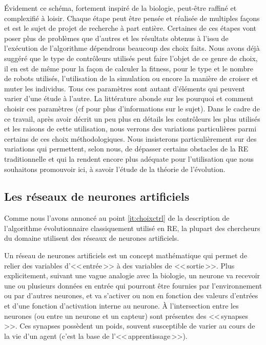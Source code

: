 Évidement ce schéma, fortement inspiré de la biologie, peut-être raffiné et complexifié à loisir. Chaque étape peut être pensée et réalisée de multiples façons et est le sujet de projet de recherche à part entière. Certaines de ces étapes vont poser plus de problèmes que d'autres et les résultats obtenus à l'issu de l'exécution de l'algorithme dépendrons beaucoup des choix faits. Nous avons déjà suggéré que le type de contrôleurs utilisés peut faire l'objet de ce genre de choix, il en est de même pour la façon de calculer la fitness, pour le type et le nombre de robots utilisés, l'utilisation de la simulation ou encore la manière de croiser et muter les individus. Tous ces paramètres sont autant d'éléments qui peuvent varier d'une étude à l'autre. La littérature abonde sur les pourquoi et comment choisir ces paramètres (cf  \cite{nolfi00evolrobobiolintetechselfmach} pour plus d'informations sur le sujet). Dans le cadre de ce travail, après avoir décrit un peu plus en détails les contrôleurs les plus utilisés et les raisons de cette utilisation, nous verrons des variations particulières parmi certains de ces choix méthodologiques. Nous insisterons particulièrement sur des variations qui permettent, selon nous, de dépasser certains obstacles de la RE traditionnelle et qui la rendent encore plus adéquate pour l'utilisation que nous souhaitons promouvoir ici, à savoir l'étude de la théorie de l'évolution.


\subsection{Les réseaux de neurones artificiels}\label{sec:RNA}

Comme nous l'avons annoncé au point \ref{it:choixctrl} de la description de l'algorithme évolutionnaire classiquement utilisé en RE, la plupart des chercheurs du domaine utilisent des réseaux de neurones artificiels.

Un réseau de neurones artificiels est un concept mathématique qui permet de relier des variables d'<<\,entrée\,>> à des variables de <<\,sortie\,>>. Plus explicitement, suivant une vague analogie avec la biologie, un neurone va recevoir une ou plusieurs données en entrée qui pourront être fournies par l'environnement ou par d'autres neurones, et va s'activer ou non en fonction des valeurs d'entrées et d'une fonction d'activation interne au neurone. À l'intersection entre les neurones (ou entre un neurone et un capteur) sont présentes des <<\,synapses\,>>. Ces synapses possèdent un poids, souvent susceptible de varier au cours de la vie d'un agent (c'est la base de l'<<\,apprentissage\,>>).

